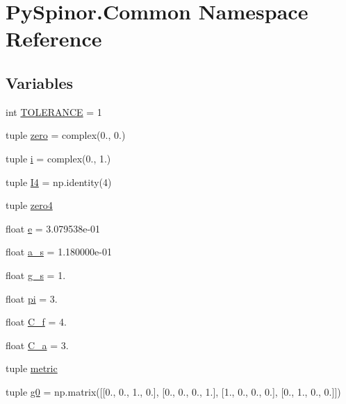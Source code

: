 \hypertarget{namespace_py_spinor_1_1_common}{}\section{Py\+Spinor.\+Common Namespace Reference}
\label{namespace_py_spinor_1_1_common}
\subsection*{Variables}
\begin{DoxyCompactItemize}
\item 
int \hyperlink{namespace_py_spinor_1_1_common_a3e3becdff2a1ae7c86d40f14642a6276}{T\+O\+L\+E\+R\+A\+N\+C\+E} = 1
\item 
tuple \hyperlink{namespace_py_spinor_1_1_common_ab2c641a200d3164b1abc845b42e74c5a}{zero} = complex(0., 0.)
\item 
tuple \hyperlink{namespace_py_spinor_1_1_common_ab859a39a1df8f134bef8d8de05741087}{i} = complex(0., 1.)
\item 
tuple \hyperlink{namespace_py_spinor_1_1_common_ad3d5637a91474adb8fb013a569e55bf0}{I4} = np.\+identity(4)
\item 
tuple \hyperlink{namespace_py_spinor_1_1_common_a4f1daadf247aeea8d70a63d9a751f2d1}{zero4}
\item 
float \hyperlink{namespace_py_spinor_1_1_common_aef34b7f3de368edb9879c7af8a30dc61}{e} = 3.\+079538e-\/01
\item 
float \hyperlink{namespace_py_spinor_1_1_common_ae68d36c853fa14acf6b2a4350c074f06}{a\+\_\+s} = 1.\+180000e-\/01
\item 
float \hyperlink{namespace_py_spinor_1_1_common_a95db89c1a8d7f2bd987a2fb50f2bbfa3}{g\+\_\+s} = 1.
\item 
float \hyperlink{namespace_py_spinor_1_1_common_aee473092fbfbb05385c7680293c25985}{pi} = 3.
\item 
float \hyperlink{namespace_py_spinor_1_1_common_a0144d88b79a2b4943c1dd016852bf6e2}{C\+\_\+f} = 4.
\item 
float \hyperlink{namespace_py_spinor_1_1_common_a83fcecc99feb47ec76f7e44c8d172517}{C\+\_\+a} = 3.
\item 
tuple \hyperlink{namespace_py_spinor_1_1_common_a812175a058f2ca8f63c4dbbebbbc211e}{metric}
\item 
tuple \hyperlink{namespace_py_spinor_1_1_common_a2a57baccead5c121998cb60965799fe8}{g0} = np.\+matrix(\mbox{[}\mbox{[}0., 0., 1., 0.\mbox{]}, \mbox{[}0., 0., 0., 1.\mbox{]}, \mbox{[}1., 0., 0., 0.\mbox{]}, \mbox{[}0., 1., 0., 0.\mbox{]}\mbox{]})

\end{DoxyCompactItemize}
